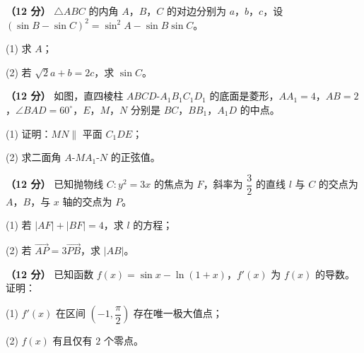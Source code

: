 \begin{question}
\textbf{（12 分）} $\triangle ABC$ 的内角 $A$，$B$，$C$ 的对边分别为 $a$，$b$，$c$，设 $(\sin B-\sin C)^{2}=\sin^{2}A-\sin B\sin C$。

  (1) 求 $A$；

  (2) 若 $\sqrt2a+b=2c$，求 $\sin C$。

\Needspace{0.4\textheight}
\end{question}
\begin{question}
\textbf{（12 分）} 如图，直四棱柱 $ABCD\text{-}A_1B_1C_1D_1$ 的底面是菱形，$AA_1=4$，$AB=2$，$\angle BAD=60^\circ$，$E$，$M$，$N$ 分别是 $BC$，$BB_1$，$A_1D$ 的中点。
\nopagebreak[4]
\begin{center}\end{center}
\nopagebreak[4]
  (1) 证明：$MN\parallel$ 平面 $C_1DE$；

  (2) 求二面角 $A\text{-}MA_1\text{-}N$ 的正弦值。

\end{question}
\begin{question}
\textbf{（12 分）} 已知抛物线 $C:y^{2}=3x$ 的焦点为 $F$，斜率为 $\dfrac32$ 的直线 $l$ 与 $C$ 的交点为 $A$，$B$，与 $x$ 轴的交点为 $P$。

  (1) 若 $|AF|+|BF|=4$，求 $l$ 的方程；

  (2) 若 $\overrightarrow{AP}=3\overrightarrow{PB}$，求 $|AB|$。

\end{question}
\begin{question}
\textbf{（12 分）} 已知函数 $f(x)=\sin x-\ln(1+x)$，$f'(x)$ 为 $f(x)$ 的导数。证明：

  (1) $f'(x)$ 在区间 $\left(-1,\dfrac\pi2\right)$ 存在唯一极大值点；

  (2) $f(x)$ 有且仅有 $2$ 个零点。

\end{question}
